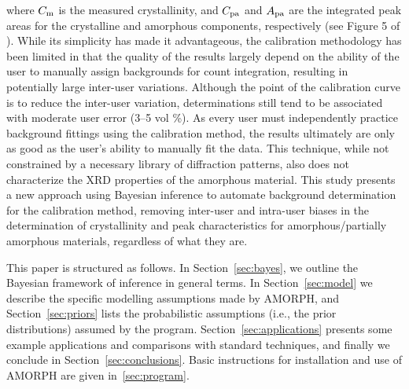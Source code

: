 \documentclass[review]{elsarticle}
\newcommand{\changed}{\color{blue}}
\begin{document}
where $C_{\rm m}$ is the measured crystallinity, and $C_{\rm pa}$ and $A_{\rm pa}$ are the integrated peak areas for the
crystalline and amorphous components, respectively (see Figure 5 of \citet{wall2014}). 
While its simplicity has made it advantageous, the calibration methodology has been limited in that
the quality of the results largely depend on the ability of the user to manually assign
backgrounds for count integration, resulting in potentially large inter-user variations. Although the
point of the calibration curve is to reduce the inter-user variation, determinations still tend to
be associated with moderate user error (3--5 vol \%). As every user must independently practice
background fittings using the calibration method, the results ultimately are only as good as the
user’s ability to manually {\changed fit} the data. This technique, while not constrained by a
necessary library of diffraction patterns, also does not characterize the XRD properties of the
amorphous material. This study presents a new approach using Bayesian inference to automate
background determination for the calibration method, removing inter-user and intra-user biases in
the determination of crystallinity and peak characteristics for amorphous/partially amorphous
materials, regardless of what they are. 

This paper is structured as follows. In Section~\ref{sec:bayes}, we outline the Bayesian
framework of inference in general terms. In Section~\ref{sec:model} we describe the
specific modelling assumptions made by AMORPH, and
Section~\ref{sec:priors} lists the probabilistic assumptions (i.e., the prior distributions)
{\changed assumed by} the program. Section~\ref{sec:applications} presents some
example applications and comparisons with standard techniques, and finally we conclude
in Section~\ref{sec:conclusions}. Basic instructions for installation and use of AMORPH are given in~\ref{sec:program}.
\end{document}
